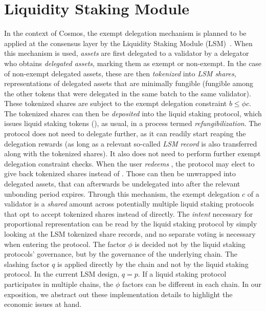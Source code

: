 \section{Liquidity Staking Module}\label{sec:lsm}


In the context
of Cosmos, the exempt delegation mechanism is planned to be applied at the consensus
layer by the Liquidity Staking Module (LSM)~\cite{liquidity-staking-module}.
When this mechanism is used, \emph{assets} are first delegated to a validator by
a delegator who obtains \emph{delegated assets}, marking them as exempt or non-exempt.
In the case of non-exempt delegated assets, these are then
\emph{tokenized} into \emph{LSM shares}, representations of delegated assets that
are minimally fungible (fungible among the other tokens that were delegated in the
same batch to the same validator). These tokenized
shares are subject to the exempt delegation constraint $b \leq \phi c$. The tokenized shares
can then be \emph{deposited} into the liquid staking protocol, which issues liquid staking
tokens (\stassets), as usual, in a process termed \emph{refungibilization}.
The protocol does not need to delegate further, as it can readily start reaping the
delegation rewards (as long as a relevant so-called \emph{LSM record} is also transferred
along with the tokenized shares).
It also does not need to perform further exempt delegation constraint checks.
When the user \emph{redeems} \stassets, the protocol may elect to give
back tokenized shares instead of \assets. Those can then be unwrapped into delegated assets,
that can afterwards be undelegated into \assets after the relevant unbonding
period expires.
Through this mechanism, the exempt delegation $c$ of a validator is
a \emph{shared} amount across potentially multiple liquid staking
protocols that opt to accept tokenized shares
instead of \assets directly. The \emph{intent} necessary for proportional
representation can be read by the liquid staking protocol by simply
looking at the LSM tokenized share records, and no separate voting is
necessary when entering the protocol. The factor $\phi$ is decided not by the
liquid staking protocols' governance, but by the governance of
the underlying chain. The slashing factor $q$ is applied directly
by the chain and not by the liquid staking protocol.
In the current LSM design, $q = p$.
If a liquid staking protocol participates in
multiple chains, the $\phi$ factors can be different in each chain.
In our exposition, we abstract out these implementation details to highlight
the economic issues at hand.

